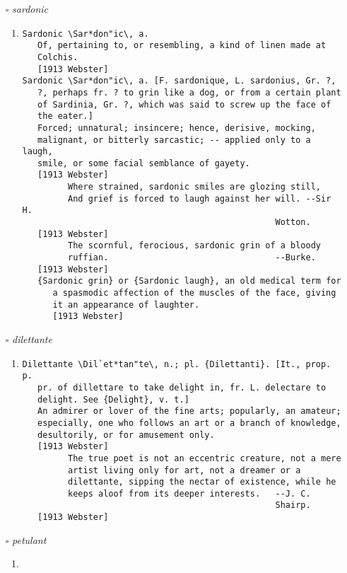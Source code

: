 \documentclass{article}
\begin{document}
\begin{itemize}
\item[$\square$] \emph{ sardonic }
\begin{enumerate}
\item{
\begin{lstlisting}
Sardonic \Sar*don"ic\, a.
   Of, pertaining to, or resembling, a kind of linen made at
   Colchis.
   [1913 Webster]
Sardonic \Sar*don"ic\, a. [F. sardonique, L. sardonius, Gr. ?,
   ?, perhaps fr. ? to grin like a dog, or from a certain plant
   of Sardinia, Gr. ?, which was said to screw up the face of
   the eater.]
   Forced; unnatural; insincere; hence, derisive, mocking,
   malignant, or bitterly sarcastic; -- applied only to a laugh,
   smile, or some facial semblance of gayety.
   [1913 Webster]
         Where strained, sardonic smiles are glozing still,
         And grief is forced to laugh against her will. --Sir H.
                                                  Wotton.
   [1913 Webster]
         The scornful, ferocious, sardonic grin of a bloody
         ruffian.                                 --Burke.
   [1913 Webster]
   {Sardonic grin} or {Sardonic laugh}, an old medical term for
      a spasmodic affection of the muscles of the face, giving
      it an appearance of laughter.
      [1913 Webster]
\end{lstlisting}}
\end{enumerate}
\item[$\square$] \emph{ dilettante }
\begin{enumerate}
\item{
\begin{lstlisting}
Dilettante \Dil`et*tan"te\, n.; pl. {Dilettanti}. [It., prop. p.
   pr. of dillettare to take delight in, fr. L. delectare to
   delight. See {Delight}, v. t.]
   An admirer or lover of the fine arts; popularly, an amateur;
   especially, one who follows an art or a branch of knowledge,
   desultorily, or for amusement only.
   [1913 Webster]
         The true poet is not an eccentric creature, not a mere
         artist living only for art, not a dreamer or a
         dilettante, sipping the nectar of existence, while he
         keeps aloof from its deeper interests.   --J. C.
                                                  Shairp.
   [1913 Webster]
\end{lstlisting}}
\end{enumerate}
\item[$\square$] \emph{ petulant }
\begin{enumerate}
\item{
\begin{lstlisting}

\end{lstlisting}}
\end{enumerate}
\end{itemize}
\end{document}
